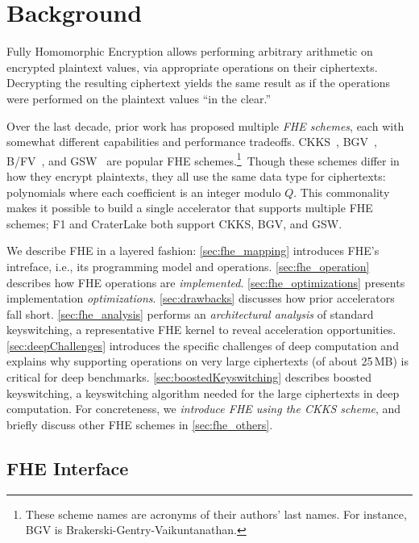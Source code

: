 \chapter{Background}\label{sec:background}

Fully Homomorphic Encryption allows performing arbitrary
arithmetic on encrypted plaintext values, via appropriate operations
on their ciphertexts. Decrypting the resulting ciphertext yields the
same result as if the operations were performed on the plaintext
values ``in the clear.''

Over the last decade, prior work has proposed multiple \emph{FHE schemes}, each
with somewhat different capabilities and performance tradeoffs.
CKKS~\cite{cheon:ictaci17:homomorphic}, BGV~\cite{brakerski:toct14:leveled},
B/FV~\cite{brakerski:crypto12:fully,fan:iacr12:somewhat}, and
GSW~\cite{gentry:crypto13:homomorphic} are popular FHE schemes.\footnote{These
scheme names are acronyms of their authors' last names. For instance, BGV is
Brakerski-Gentry-Vaikuntanathan.}~Though these schemes differ in how they
encrypt plaintexts, they all use the same data type for ciphertexts:
polynomials where each coefficient is an integer modulo $Q$. This commonality
makes it possible to build a single accelerator that supports multiple FHE
schemes; F1 and CraterLake both support CKKS, BGV, and GSW.

We describe FHE in a layered fashion: \autoref{sec:fhe_mapping} introduces
FHE's intreface, i.e., its programming model and operations.
\autoref{sec:fhe_operation} describes how FHE operations are
\emph{implemented}. \autoref{sec:fhe_optimizations} presents implementation
\emph{optimizations}. \autoref{sec:drawbacks} discusses how prior accelerators
fall short. \autoref{sec:fhe_analysis} performs an \emph{architectural
analysis} of standard keyswitching, a representative FHE kernel to reveal
acceleration opportunities. \autoref{sec:deepChallenges} introduces the
specific challenges of deep computation and explains why supporting operations
on very large ciphertexts (of about 25\,MB) is critical for deep
benchmarks. \autoref{sec:boostedKeyswitching} describes boosted keyswitching, a
keyswitching algorithm needed for the large ciphertexts in deep computation.
 For concreteness, we \emph{introduce FHE
using the CKKS scheme}, and briefly discuss other FHE schemes in
\autoref{sec:fhe_others}.

\section{FHE Interface}
\label{sec:fhe_mapping}

